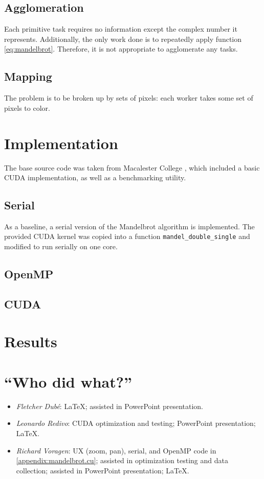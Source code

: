 \documentclass{article}
\begin{document}
\subsection{Agglomeration}
Each primitive task requires no information except the complex number it represents. Additionally, the only work done is to repeatedly apply function \ref{eq:mandelbrot}. Therefore, it is not appropriate to agglomerate any tasks.

\subsection{Mapping}
The problem is to be broken up by sets of pixels: each worker takes some set of pixels to color.


\section{Implementation} \label{sec:impl}
The base source code was taken from Macalester College \cite{mandel_orig}, which included a basic CUDA implementation, as well as a benchmarking utility.

\subsection{Serial}
As a baseline, a serial version of the Mandelbrot algorithm is implemented. The provided CUDA kernel was copied into a function \verb|mandel_double_single| and modified to run serially on one core.

\subsection{OpenMP}


\subsection{CUDA}



\section{Results}
\appendix
\pagebreak
\section{``Who did what?''}
\begin{itemize}
	\item \emph{Fletcher Dub\'e}: \LaTeX{}; assisted in PowerPoint presentation.

	\item \emph{Leonardo Redivo}: CUDA optimization and testing; PowerPoint presentation; \LaTeX{}.

	\item \emph{Richard Voragen}: UX (zoom, pan), serial, and OpenMP code in \ref{appendix:mandelbrot.cu}; assisted in optimization testing and data collection; assisted in PowerPoint presentation; \LaTeX{}.
\end{itemize}
\end{document}

